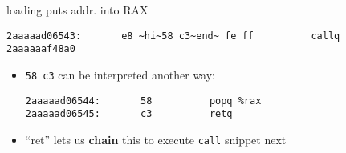 \begin{frame}[fragile,label=loadRAXCode]{loading puts addr. into RAX}
\begin{lstlisting}
2aaaaad06543:       e8 ~hi~58 c3~end~ fe ff          callq  2aaaaaaf48a0
\end{lstlisting}
\begin{itemize}
    \item {\tt 58 c3} can be interpreted another way: 
\begin{lstlisting}
2aaaaad06544:       58          popq %rax
2aaaaad06545:       c3          retq
\end{lstlisting}
    \item ``ret'' lets us \textbf{chain} this to execute \texttt{call} snippet next
\end{itemize}
\end{frame}

